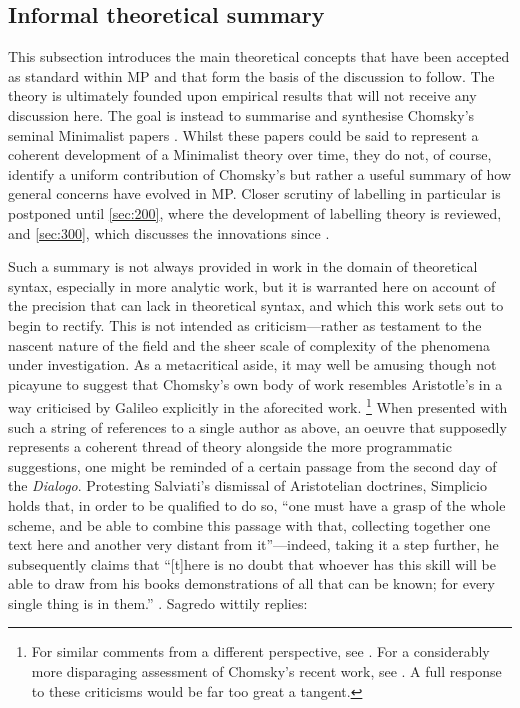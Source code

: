 \subsection{Informal theoretical summary}\label{sec:140}

This subsection introduces the main theoretical concepts that have been accepted as standard within MP and that form the basis of the discussion to follow. The theory is ultimately founded upon empirical results that will not receive any discussion here. The goal is instead to summarise and synthesise Chomsky's seminal Minimalist papers \parencite{ChomskyN_1993,ChomskyN_1994,ChomskyN_1995,ChomskyN_2000,ChomskyN_2001,ChomskyN_2004,ChomskyN_2007,ChomskyN_2008,ChomskyN_2013,ChomskyN_2014,ChomskyN_2015,ChomskyN.etal_2019,ChomskyN_2019b,ChomskyN_2020,ChomskyN_2021}. Whilst these papers could be said to represent a coherent development of a Minimalist theory over time, they do not, of course, identify a uniform contribution of Chomsky's but rather a useful summary of how general concerns have evolved in MP. Closer scrutiny of labelling in particular is postponed until \autoref{sec:200}, where the development of labelling theory is reviewed, and \autoref{sec:300}, which discusses the innovations since \textcite{ChomskyN_2013,ChomskyN_2015}.

Such a summary is not always provided in work in the domain of theoretical syntax, especially in more analytic work, but it is warranted here on account of the precision that can lack in theoretical syntax, and which this work sets out to begin to rectify. This is not intended as criticism---rather as testament to the nascent nature of the field and the sheer scale of complexity of the phenomena under investigation. As a metacritical aside, it may well be amusing though not picayune to suggest that Chomsky's own body of work resembles Aristotle's in a way criticised by Galileo explicitly in the aforecited work.%
\footnote{For similar comments from a different perspective, see \textcite{AsudehA.ToivonenI_2006}. For a considerably more disparaging assessment of Chomsky's recent work, see \textcite{BehmeC_2014,BehmeC_2015}. A full response to these criticisms would be far too great a tangent.}
When presented with such a string of references to a single author as above, an oeuvre that supposedly represents a coherent thread of theory alongside the more programmatic suggestions, one might be reminded of a certain passage from the second day of the \textit{Dialogo}. Protesting Salviati's dismissal of Aristotelian doctrines, Simplicio holds that, in order to be qualified to do so, ``one must have a grasp of the whole scheme, and be able to combine this passage with that, collecting together one text here and another very distant from it''---indeed, taking it a step further, he subsequently claims that ``[t]here is no doubt that whoever has this skill will be able to draw from his books demonstrations of all that can be known; for every single thing is in them.'' \parencite[108]{Galileo_1967}. Sagredo wittily replies: 

